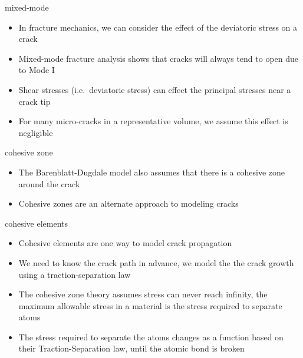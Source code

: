 \documentclass[
  letterpaper,
  ignorenonframetext,
  aspectratio=43,
  handout,
  12pt]{beamer}
\providecommand{\tightlist}{%
  \setlength{\itemsep}{0pt}\setlength{\parskip}{0pt}}
\providecommand{\tightlist}{%
\setlength{\itemsep}{0pt}\setlength{\parskip}{0pt}}
\begin{document}
\begin{frame}{mixed-mode}
\protect\hypertarget{mixed-mode}{}
\begin{itemize}
\tightlist
\item
  In fracture mechanics, we can consider the effect of the deviatoric
  stress on a crack
\item
  Mixed-mode fracture analysis shows that cracks will always tend to
  open due to Mode I
\item
  Shear stresses (i.e.~deviatoric stress) can effect the principal
  stresses near a crack tip
\item
  For many micro-cracks in a representative volume, we assume this
  effect is negligible
\end{itemize}
\end{frame}

\begin{frame}{cohesive zone}
\protect\hypertarget{cohesive-zone}{}
\begin{itemize}
\tightlist
\item
  The Barenblatt-Dugdale model also assumes that there is a cohesive
  zone around the crack
\item
  Cohesive zones are an alternate approach to modeling cracks
\end{itemize}
\end{frame}

\begin{frame}{cohesive elements}
\protect\hypertarget{cohesive-elements}{}
\begin{itemize}
\tightlist
\item
  Cohesive elements are one way to model crack propagation
\item
  We need to know the crack path in advance, we model the the crack
  growth using a traction-separation law
\item
  The cohesive zone theory assumes stress can never reach infinity, the
  maximum allowable stress in a material is the stress required to
  separate atoms
\item
  The stress required to separate the atoms changes as a function based
  on their Traction-Separation law, until the atomic bond is broken
\end{itemize}
\end{frame}
\end{document}
